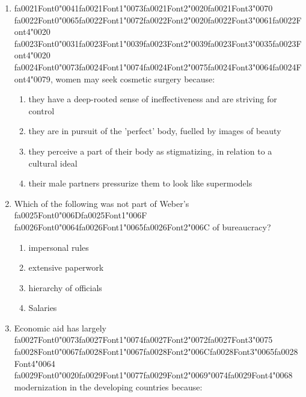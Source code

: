 \documentclass[12pt]{article}
\begin{document}
\begin{enumerate}[label=\arabic*.]
\begin{enumerate}[label=(\alph*)]
    \item the production process
    \item each other and humanity in general
    \item all of the above
\end{enumerate}
\item {\csname fa0021Font0\endcsname\char"0041}{\csname fa0021Font1\endcsname\char"0073}{\csname fa0021Font2\endcsname\char"0020}{\csname fa0021Font3\endcsname\char"0070} {\csname fa0022Font0\endcsname\char"0065}{\csname fa0022Font1\endcsname\char"0072}{\csname fa0022Font2\endcsname\char"0020}{\csname fa0022Font3\endcsname\char"0061}{\csname fa0022Font4\endcsname\char"0020} {\csname fa0023Font0\endcsname\char"0031}{\csname fa0023Font1\endcsname\char"0039}{\csname fa0023Font2\endcsname\char"0039}{\csname fa0023Font3\endcsname\char"0035}{\csname fa0023Font4\endcsname\char"0020} {\csname fa0024Font0\endcsname\char"0073}{\csname fa0024Font1\endcsname\char"0074}{\csname fa0024Font2\endcsname\char"0075}{\csname fa0024Font3\endcsname\char"0064}{\csname fa0024Font4\endcsname\char"0079}, women may seek cosmetic surgery because:
\begin{enumerate}[label=(\alph*)]
    \item they have a deep-rooted sense of ineffectiveness and are striving for control
    \item they are in pursuit of the 'perfect' body, fuelled by images of beauty
    \item they perceive a part of their body as stigmatizing, in relation to a cultural ideal
    \item their male partners pressurize them to look like supermodels
\end{enumerate}
\item Which of the following was not part of Weber's {\csname fa0025Font0\endcsname\char"006D}{\csname fa0025Font1\endcsname\char"006F} {\csname fa0026Font0\endcsname\char"0064}{\csname fa0026Font1\endcsname\char"0065}{\csname fa0026Font2\endcsname\char"006C} of bureaucracy?
\begin{enumerate}[label=(\alph*)]
    \item impersonal rules
    \item extensive paperwork
    \item hierarchy of officials
    \item Salaries
\end{enumerate}
\item Economic aid has largely {\csname fa0027Font0\endcsname\char"0073}{\csname fa0027Font1\endcsname\char"0074}{\csname fa0027Font2\endcsname\char"0072}{\csname fa0027Font3\endcsname\char"0075} {\csname fa0028Font0\endcsname\char"0067}{\csname fa0028Font1\endcsname\char"0067}{\csname fa0028Font2\endcsname\char"006C}{\csname fa0028Font3\endcsname\char"0065}{\csname fa0028Font4\endcsname\char"0064} {\csname fa0029Font0\endcsname\char"0020}{\csname fa0029Font1\endcsname\char"0077}{\csname fa0029Font2\endcsname\char"0069}{\char"0074}{\csname fa0029Font4\endcsname\char"0068} modernization in the developing countries because:

\end{enumerate}
\end{document}
